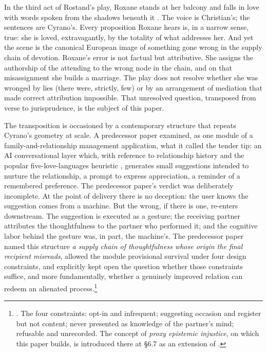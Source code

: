 \documentclass[11pt,a4paper]{article}
\newcommand{\term}[1]{\textit{\textcolor{pinkitalic}{#1}}}
\begin{document}
In the third act of Rostand's play, Roxane stands at her balcony and falls in love with words spoken from the shadows beneath it \parencite{rostand1897cyrano}. The voice is Christian's; the sentences are Cyrano's. Every proposition Roxane hears is, in a narrow sense, true: she is loved, extravagantly, by the totality of what addresses her. And yet the scene is the canonical European image of something gone wrong in the supply chain of devotion. Roxane's error is not factual but attributive. She assigns the authorship of the attending to the wrong node in the chain, and on that misassignment she builds a marriage. The play does not resolve whether she was wronged by lies (there were, strictly, few) or by an arrangement of mediation that made correct attribution impossible. That unresolved question, transposed from verse to jurisprudence, is the subject of this paper.

The transposition is occasioned by a contemporary structure that repeats Cyrano's geometry at scale. A predecessor paper \parencite{huang2025toward} examined, as one module of a family-and-relationship management application, what it called the tender tip: an AI conversational layer which, with reference to relationship history and the popular five-love-languages heuristic \parencite[cited there with explicit qualifications]{chapman1992five}, generates small suggestions intended to nurture the relationship, a prompt to express appreciation, a reminder of a remembered preference. The predecessor paper's verdict was deliberately incomplete. At the point of delivery there is no deception: the user knows the suggestion comes from a machine. But the wrong, if there is one, re-enters downstream. The suggestion is executed as a gesture; the receiving partner attributes the thoughtfulness to the partner who performed it; and the cognitive labor behind the gesture was, in part, the machine's. The predecessor paper named this structure \term{a supply chain of thoughtfulness whose origin the final recipient misreads}, allowed the module provisional survival under four design constraints, and explicitly kept open the question whether those constraints suffice, and more fundamentally, whether a genuinely improved relation can redeem an alienated process.\footnote{\textcite[\S 6.6, \S 6.7]{huang2025toward}. The four constraints: opt-in and infrequent; suggesting occasion and register but not content; never presented as knowledge of the partner's mind; refusable and unrecorded. The concept of \emph{proxy epistemic injustice}, on which this paper builds, is introduced there at \S 6.7 as an extension of \textcite{fricker2007epistemic}.}
\end{document}
